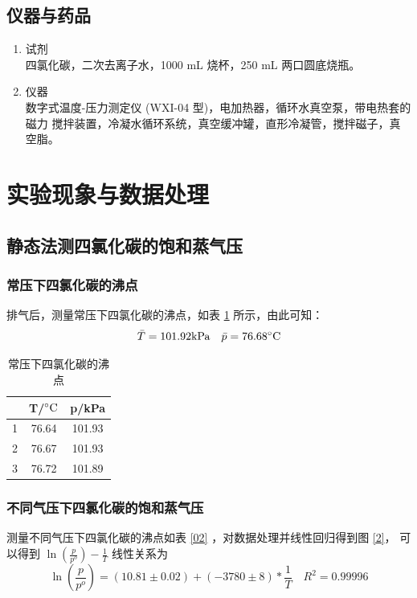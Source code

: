\documentclass[cn,hazy,pku,12pt,normal,math=newtx,cite=super]{elegantnote}
\begin{document}
\subsection{仪器与药品}

\begin{enumerate} %
    \item 试剂 \\   四氯化碳，二次去离子水，1000 mL 烧杯，250 mL 两口圆底烧瓶。
    \item 仪器 \\   数字式温度-压力测定仪 (WXI-04 型)，电加热器，循环水真空泵，带电热套的磁力
    搅拌装置，冷凝水循环系统，真空缓冲罐，直形冷凝管，搅拌磁子，真空脂。
\end{enumerate}

\section{实验现象与数据处理}
\subsection{静态法测四氯化碳的饱和蒸气压}
\subsubsection{常压下四氯化碳的沸点}

排气后，测量常压下四氯化碳的沸点，如表 \ref{01} 所示，由此可知：
$$
\bar{T} = 101.92 {\rm kPa} \quad \bar{p}  = 76.68 {\rm \degree C}
$$

\begin{table}[h]
    \centering
    \caption{常压下四氯化碳的沸点}
    \label{01}
    \begin{tabular}{ccc}
    \hline
      & T/$\rm \degree C$ & p/kPa  \\ \hline
    1 & 76.64         & 101.93 \\
    2 & 76.67         & 101.93 \\
    3 & 76.72         & 101.89 \\ \hline
    \end{tabular}
\end{table}


\subsubsection{不同气压下四氯化碳的饱和蒸气压}

测量不同气压下四氯化碳的沸点如表 \ref{02} ，对数据处理并线性回归得到图 \ref{2}，
可以得到 $\ln(\frac{p}{p^o}) - \frac{1}{T}$ 线性关系为
$$
\ln(\frac{p}{p^o}) = (10.81 \pm 0.02) + (-3780 \pm 8) * \frac{1}{T} \quad R^2=0.99996
$$
\end{document}
